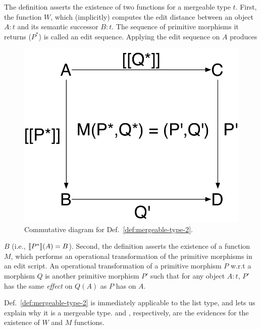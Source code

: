 The definition asserts the existence of two functions for a mergeable
type $t$. First, the function $W$, which (implicitly) computes the
edit distance between an object $A:t$ and its semantic successor
$B:t$.  The sequence of primitive morphisms it returns ($P^*$) is
called an edit sequence. Applying the edit sequence on $A$ produces
\begin{figure}
\centering
\includegraphics[scale=0.35]{Figures/pushouts-2}
\caption{Commutative diagram for Def.~\ref{def:mergeable-type-2}.}
\label{fig:pushouts-2}
\end{figure}
$B$ (i.e., $\llbracket P^* \rrbracket(A) = B$). Second, the definition asserts the
existence of a function $M$, which performs an operational
transformation of the primitive morphisms in an edit script. An
operational transformation of a primitive morphism $P$ w.r.t a
morphism $Q$ is another primitive morphism $P'$ such that for any
object $A:t$, $P'$ has the same \emph{effect} on $Q(A)$ as $P$ has on
$A$.

Def.~\ref{def:mergeable-type-2} is immediately applicable to the list
type, and lets us explain why it is a mergeable type.  
and , respectively, are the evidences for the
existence of $W$ and $M$ functions.
  

